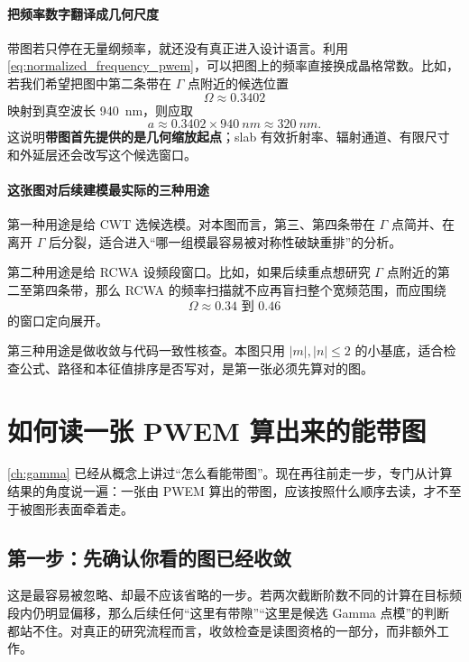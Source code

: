 \paragraph{把频率数字翻译成几何尺度}
带图若只停在无量纲频率，就还没有真正进入设计语言。利用\cref{eq:normalized_frequency_pwem}，可以把图上的频率直接换成晶格常数。比如，若我们希望把图中第二条带在 $\Gamma$ 点附近的候选位置
\begin{equation}
\Omega \approx 0.3402
\end{equation}
映射到真空波长 \SI{940}{nm}，则应取
\begin{equation}
a \approx 0.3402\times \SI{940}{nm}\approx \SI{320}{nm}.
\end{equation}
这说明\textbf{带图首先提供的是几何缩放起点}；slab 有效折射率、辐射通道、有限尺寸和外延层还会改写这个候选窗口。

\paragraph{这张图对后续建模最实际的三种用途}
第一种用途是给 CWT 选候选模。对本图而言，第三、第四条带在 $\Gamma$ 点简并、在离开 $\Gamma$ 后分裂，适合进入“哪一组模最容易被对称性破缺重排”的分析。

第二种用途是给 RCWA 设频段窗口。比如，如果后续重点想研究 $\Gamma$ 点附近的第二至第四条带，那么 RCWA 的频率扫描就不应再盲扫整个宽频范围，而应围绕
\begin{equation}
\Omega \approx 0.34 \text{ 到 } 0.46
\end{equation}
的窗口定向展开。

第三种用途是做收敛与代码一致性核查。本图只用 $|m|,|n|\le 2$ 的小基底，适合检查公式、路径和本征值排序是否写对，是第一张必须先算对的图。

\section{如何读一张 PWEM 算出来的能带图}
\cref{ch:gamma} 已经从概念上讲过“怎么看能带图”。现在再往前走一步，专门从计算结果的角度说一遍：一张由 PWEM 算出的带图，应该按照什么顺序去读，才不至于被图形表面牵着走。

\subsection*{第一步：先确认你看的图已经收敛}
这是最容易被忽略、却最不应该省略的一步。若两次截断阶数不同的计算在目标频段内仍明显偏移，那么后续任何“这里有带隙”“这里是候选 Gamma 点模”的判断都站不住。对真正的研究流程而言，收敛检查是读图资格的一部分，而非额外工作。

